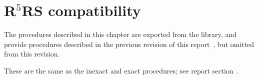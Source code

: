 \chapter{R$^5$RS compatibility}
\label{r5rscompatchapter}

The procedures described in this chapter are exported from the
 library, and provide procedures described in the
previous revision of this report~\cite{R5RS}, but omitted from this
revision.

\begin{entry}{%
}

These are the same as the {\cf inexact} and {\cf exact}
procedures; see report section~.
\end{entry}

